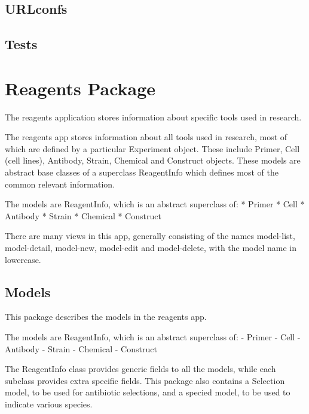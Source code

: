 \documentclass[letterpaper,10pt,english]{sphinxmanual}
\begin{document}
\subsection{URLconfs}
\label{api:id16}

\subsection{Tests}
\label{api:id17}

\section{Reagents Package}
\label{api:module-experimentdb.reagents}\label{api:reagents-package}
The reagents application stores information about specific tools used in research.

The reagents app stores information about all tools used in research, most of which are defined by a particular Experiment object.  These include Primer, Cell (cell lines), Antibody, Strain, Chemical and Construct objects.  These models are abstract base classes of a superclass ReagentInfo which defines most of the common relevant information.

The models are ReagentInfo, which is an abstract superclass of:
* Primer
* Cell
* Antibody
* Strain
* Chemical
* Construct

There are many views in this app, generally consisting of the names model-list, model-detail, model-new, model-edit and model-delete, with the model name in lowercase.


\subsection{Models}
\label{api:id18}\label{api:module-experimentdb.reagents.models}
This package describes the models in the reagents app.

The models are ReagentInfo, which is an abstract superclass of:
- Primer
- Cell
- Antibody
- Strain
- Chemical
- Construct

The ReagentInfo class provides generic fields to all the models, while each subclass provides extra specific fields.
This package also contains a Selection model, to be used for antibiotic selections, and a specied model, to be used to indicate various species.
\end{document}

